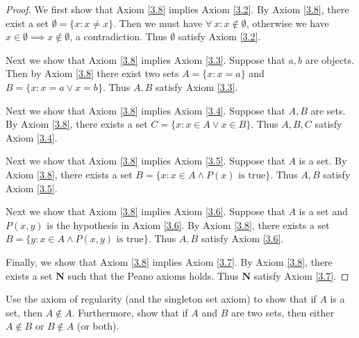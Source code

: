 \begin{proof}
    We first show that Axiom \ref{3.8} implies Axiom \ref{3.2}.
    By Axiom \ref{3.8}, there exist a set \(\emptyset = \{x: x \neq x\}\).
    Then we must have \(\forall\ x : x \notin \emptyset\), otherwise we have \(x \in \emptyset \implies x \notin \emptyset\), a contradiction.
    Thus \(\emptyset\) satisfy Axiom \ref{3.2}.

    Next we show that Axiom \ref{3.8} implies Axiom \ref{3.3}.
    Suppose that \(a, b\) are objects.
    Then by Axiom \ref{3.8} there exist two sets \(A = \{x: x = a\}\) and \(B = \{x: x = a \lor x = b\}\).
    Thus \(A, B\) satisfy Axiom \ref{3.3}.

    Next we show that Axiom \ref{3.8} implies Axiom \ref{3.4}.
    Suppose that \(A, B\) are sets.
    By Axiom \ref{3.8}, there exists a set \(C = \{x : x \in A \lor x \in B\}\).
    Thus \(A, B, C\) satisfy Axiom \ref{3.4}.

    Next we show that Axiom \ref{3.8} implies Axiom \ref{3.5}.
    Suppose that \(A\) is a set.
    By Axiom \ref{3.8}, there exists a set \(B = \{x : x \in A \land P(x) \text{ is true}\}\).
    Thus \(A, B\) satisfy Axiom \ref{3.5}.

    Next we show that Axiom \ref{3.8} implies Axiom \ref{3.6}.
    Suppose that \(A\) is a set and \(P(x, y)\) is the hypothesis in Axiom \ref{3.6}.
    By Axiom \ref{3.8}, there exists a set \(B = \{y :  x \in A \land P(x, y) \text{ is true}\}\).
    Thus \(A, B\) satisfy Axiom \ref{3.6}.

    Finally, we show that Axiom \ref{3.8} implies Axiom \ref{3.7}.
    By Axiom \ref{3.8}, there exists a set \(\mathbf{N}\) such that the Peano axioms holds.
    Thus \(\mathbf{N}\) satisfy Axiom \ref{3.7}.
\end{proof}

\begin{exercise}\label{ex 3.2.2}
    Use the axiom of regularity (and the singleton set axiom) to show that if \(A\) is a set, then \(A \notin A\).
    Furthermore, show that if \(A\) and \(B\) are two sets, then either \(A \notin B\) or \(B \notin A\) (or both).
\end{exercise}

